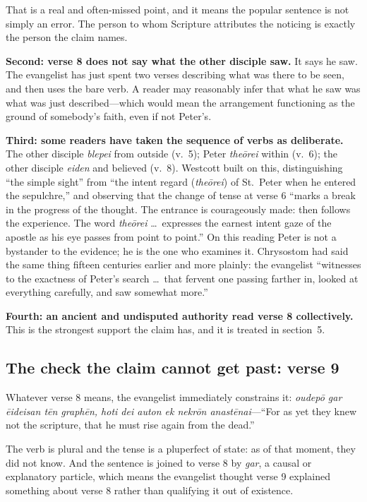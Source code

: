 That is a real and often-missed point, and it means the popular sentence is not
simply an error. The person to whom Scripture attributes the noticing is
exactly the person the claim names.

\textbf{Second: verse 8 does not say what the other disciple saw.} It says he
saw. The evangelist has just spent two verses describing what was there to be
seen, and then uses the bare verb. A reader may reasonably infer that what he
saw was what was just described---which would mean the arrangement functioning
as the ground of somebody's faith, even if not Peter's.

\textbf{Third: some readers have taken the sequence of verbs as deliberate.}
The other disciple \emph{blepei} from outside (v.~5); Peter \emph{the\=orei}
within (v.~6); the other disciple \emph{eiden} and believed (v.~8). Westcott
built on this, distinguishing ``the simple sight'' from ``the intent regard
(\emph{the\=orei}) of St.\ Peter when he entered the sepulchre,'' and observing
that the change of tense at verse 6 ``marks a break in the progress of the
thought. The entrance is courageously made: then follows the experience. The
word \emph{the\=orei} \ldots\ expresses the earnest intent gaze of the apostle
as his eye passes from point to point.'' On this reading Peter is not a
bystander to the evidence; he is the one who examines it. Chrysostom had said
the same thing fifteen centuries earlier and more plainly: the evangelist
``witnesses to the exactness of Peter's search \ldots\ that fervent one
passing farther in, looked at everything carefully, and saw somewhat more.''

\textbf{Fourth: an ancient and undisputed authority read verse 8 collectively.}
This is the strongest support the claim has, and it is treated in section~5.

\subsection{The check the claim cannot get past: verse 9}

Whatever verse 8 means, the evangelist immediately constrains it:
\emph{oudep\=o gar \=eideisan t\=en graph\=en, hoti dei auton ek nekr\=on
anast\=enai}---``For as yet they knew not the scripture, that he must rise
again from the dead.''

The verb is plural and the tense is a pluperfect of state: as of that moment,
they did not know. And the sentence is joined to verse 8 by \emph{gar}, a
causal or explanatory particle, which means the evangelist thought verse 9
explained something about verse 8 rather than qualifying it out of existence.

